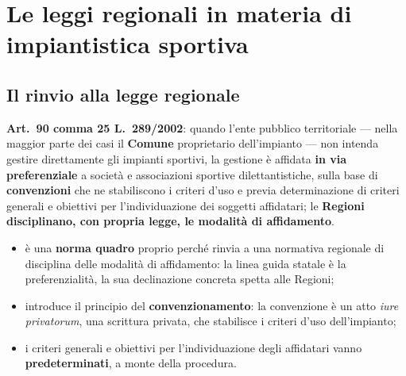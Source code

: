 \chapter{Le leggi regionali in materia di impiantistica sportiva}

\section{Il rinvio alla legge regionale}

\textbf{Art.\ 90 comma 25 L.\ 289/2002}: quando l'ente pubblico territoriale --- nella maggior
parte dei casi il \textbf{Comune} proprietario dell'impianto --- non intenda gestire direttamente
gli impianti sportivi, la gestione è affidata \textbf{in via preferenziale} a società e
associazioni sportive dilettantistiche, sulla base di \textbf{convenzioni} che ne stabiliscono i
criteri d'uso e previa determinazione di criteri generali e obiettivi per l'individuazione dei
soggetti affidatari; le \textbf{Regioni disciplinano, con propria legge, le modalità di
affidamento}.

\begin{itemize}
  \item è una \textbf{norma quadro} proprio perché rinvia a una normativa regionale di disciplina
    delle modalità di affidamento: la linea guida statale è la preferenzialità, la sua
    declinazione concreta spetta alle Regioni;
  \item introduce il principio del \textbf{convenzionamento}: la convenzione è un atto \textit{iure
    privatorum}, una scrittura privata, che stabilisce i criteri d'uso dell'impianto;
  \item i criteri generali e obiettivi per l'individuazione degli affidatari vanno
    \textbf{predeterminati}, a monte della procedura.
\end{itemize}


